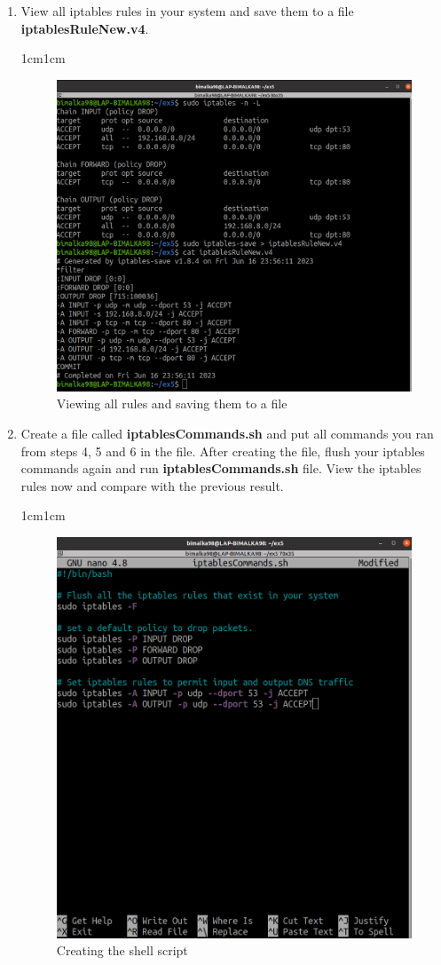 \documentclass[11pt,letterpaper]{article}
\newenvironment{answer}{\em \color{blue} \begin{adjustwidth}{1cm}{1cm}}{\end{adjustwidth}}
\begin{document}
\begin{enumerate}
		\item View all iptables rules in your system and save them to a file \textbf{iptablesRuleNew.v4}. 
		\begin{answer}
			\begin{figure}[H]
				\centering
				\includegraphics[width=0.65\columnwidth]{images/part1/9.png}
				\caption{Viewing all rules and saving them to a file}
			\end{figure}
		\end{answer}
		
		\item Create a file called \textbf{iptablesCommands.sh} and put all commands you ran from steps 4, 5 and 6 in the file. After creating the file, flush your iptables commands again and run \textbf{iptablesCommands.sh} file. View the iptables rules now and compare with the previous result.
		\begin{answer}
			\begin{figure}[H]
				\centering
				\includegraphics[width=0.65\columnwidth]{images/part1/10_1.png}
				\caption{Creating the shell script}
			\end{figure}
			

\end{answer}
\end{enumerate}
\end{document}
